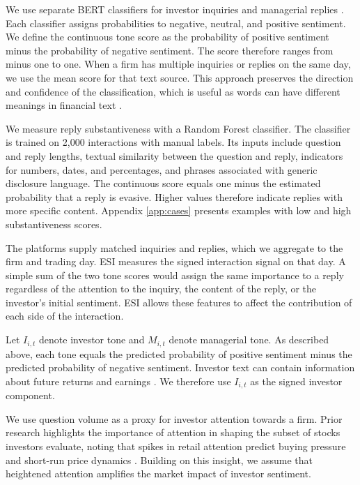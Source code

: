 \documentclass[12pt]{article}
\begin{document}
We use separate BERT classifiers for investor inquiries and managerial replies \citep{liu2020finbert}. Each classifier assigns probabilities to negative, neutral, and positive sentiment. We define the continuous tone score as the probability of positive sentiment minus the probability of negative sentiment. The score therefore ranges from minus one to one. When a firm has multiple inquiries or replies on the same day, we use the mean score for that text source. This approach preserves the direction and confidence of the classification, which is useful as words can have different meanings in financial text \citep{loughran2011}.

We measure reply substantiveness with a Random Forest classifier. The classifier is trained on 2,000 interactions with manual labels. Its inputs include question and reply lengths, textual similarity between the question and reply, indicators for numbers, dates, and percentages, and phrases associated with generic disclosure language. The continuous score equals one minus the estimated probability that a reply is evasive. Higher values therefore indicate replies with more specific content. Appendix \ref{app:cases} presents examples with low and high substantiveness scores.

The platforms supply matched inquiries and replies, which we aggregate to the firm and trading day. ESI measures the signed interaction signal on that day. A simple sum of the two tone scores would assign the same importance to a reply regardless of the attention to the inquiry, the content of the reply, or the investor's initial sentiment. ESI allows these features to affect the contribution of each side of the interaction.

Let $I_{i,t}$ denote investor tone and $M_{i,t}$ denote managerial tone. As described above, each tone equals the predicted probability of positive sentiment minus the predicted probability of negative sentiment. Investor text can contain information about future returns and earnings \citep{bartov2018,chen2014,cookson2024}. We therefore use $I_{i,t}$ as the signed investor component.

We use question volume as a proxy for investor attention towards a firm. Prior research highlights the importance of attention in shaping the subset of stocks investors evaluate, noting that spikes in retail attention predict buying pressure and short-run price dynamics \citep{barber2008,da2011}. Building on this insight, we assume that heightened attention amplifies the market impact of investor sentiment. 
\end{document}
